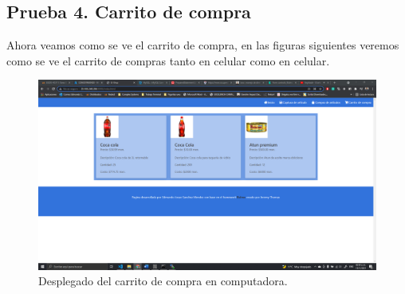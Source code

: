 \documentclass[11pt]{article}
\begin{document}
		\subsection{Prueba 4. Carrito de compra}
	Ahora veamos como se ve el carrito de compra, en las figuras siguientes veremos como se ve el carrito de compras tanto en celular como en celular.
		\begin{figure}[H]
			\centering
			\includegraphics[scale=0.34]{resources/p4.png}
			\caption{Desplegado del carrito de compra en computadora.}\label{fig:picture}
		\end{figure}
\end{document}

